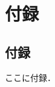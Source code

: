 \documentclass[a4paper,10pt, uplatex, report, openany]{jsbook}
\begin{document}

\makeatletter
\def\@makechapterhead#1{%
  {\parindent \z@ \raggedright \normalfont
    \ifnum \c@secnumdepth >\m@ne
        \huge\bfseries \@chapapp\thechapter 章
        \par\nobreak
        \vskip 15\p@
    \fi
    \interlinepenalty\@M
    \Huge \bfseries #1\par\nobreak
    \vskip 40\p@
  }}
\def\@makeschapterhead#1{%
  {\parindent \z@ \raggedright
    \normalfont
    \interlinepenalty\@M
    \Huge \bfseries  #1\par\nobreak
    \vskip 20\p@
  }}
\makeatother


\chapter*{{\huge 付録}}
\renewcommand{\thesection}{付録 \Alph{section}}

\setcounter{section}{0}
\section{付録}
ここに付録．
\end{document}
